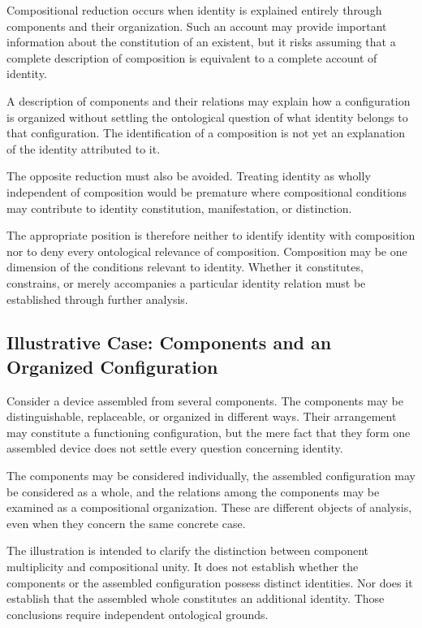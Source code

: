 Compositional reduction occurs when identity is explained
entirely through components and their organization.
Such an account may provide important information
about the constitution of an existent, but it risks
assuming that a complete description of composition
is equivalent to a complete account of identity.

A description of components and their relations may
explain how a configuration is organized without
settling the ontological question of what identity
belongs to that configuration. The identification
of a composition is not yet an explanation of the
identity attributed to it.

The opposite reduction must also be avoided. Treating
identity as wholly independent of composition would
be premature where compositional conditions may
contribute to identity constitution, manifestation,
or distinction.

The appropriate position is therefore neither to
identify identity with composition nor to deny every
ontological relevance of composition. Composition
may be one dimension of the conditions relevant to
identity. Whether it constitutes, constrains, or
merely accompanies a particular identity relation
must be established through further analysis.

\subsection{Illustrative Case: Components and an Organized Configuration}

Consider a device assembled from several components.
The components may be distinguishable, replaceable,
or organized in different ways. Their arrangement
may constitute a functioning configuration, but the
mere fact that they form one assembled device does
not settle every question concerning identity.

The components may be considered individually, the
assembled configuration may be considered as a whole,
and the relations among the components may be examined
as a compositional organization. These are different
objects of analysis, even when they concern the same
concrete case.



The illustration is intended to clarify the distinction
between component multiplicity and compositional unity.
It does not establish whether the components or the
assembled configuration possess distinct identities.
Nor does it establish that the assembled whole constitutes
an additional identity. Those conclusions require
independent ontological grounds.

